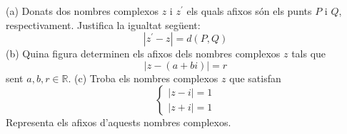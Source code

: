 \begin{exemple}
(a) Donats dos nombres complexos $z$ i $z^{\prime }$ els quals afixos són els
punts $P$ i $Q$, respectivament. Justifica la igualtat següent:
\begin{equation*}
\left\vert z^{\prime }-z\right\vert =d(P,Q)
\end{equation*}
(b) Quina figura determinen els afixos dels nombres complexos $z$
tals que
\begin{equation*}
\left\vert z-(a+bi)\right\vert =r
\end{equation*}
sent $a,b,r\in \mathbb{R}$. (c) Troba els nombres complexos $z$
que satisfan
\begin{equation*}
\left\{
\begin{array}{l}
\left\vert z-i\right\vert =1 \\
\left\vert z+i\right\vert =1
\end{array}
\right.
\end{equation*}
Representa els afixos d’aquests nombres complexos.
\end{exemple}

